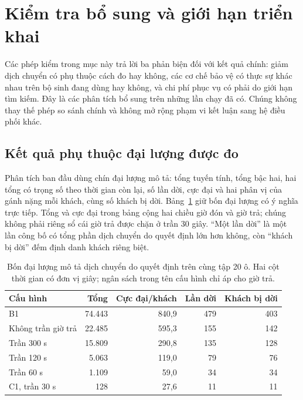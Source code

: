 \section{Kiểm tra bổ sung và giới hạn triển khai}
\label{muc:kiemtraphu}

Các phép kiểm trong mục này trả lời ba phản biện đối với kết quả chính: giảm dịch chuyển
có phụ thuộc cách đo hay không, các cơ chế bảo vệ có thực sự khác nhau trên bộ sinh đang
dùng hay không, và chi phí phục vụ có phải do giới hạn tìm kiếm. Đây là các phân tích bổ
sung trên những lần chạy đã có. Chúng không thay thế phép so sánh chính và không mở rộng
phạm vi kết luận sang hệ điều phối khác.

\subsection{Kết quả phụ thuộc đại lượng được đo}


Phân tích ban đầu dùng chín đại lượng mô tả: tổng tuyến tính, tổng bậc hai, hai tổng có
trọng số theo thời gian còn lại, số lần dời, cực đại và hai phân vị của gánh nặng mỗi khách,
cùng số khách bị dời. Bảng~\ref{bang:kiemtra-thuocdo} giữ bốn đại lượng có ý nghĩa trực
tiếp. Tổng và cực đại trong bảng cộng hai chiều giờ đón và giờ trả; chúng không phải riêng
sổ cái giờ trả được chặn ở trần 30 giây. ``Một lần dời'' là một lần công bố có tổng phần
dịch chuyển do quyết định lớn hơn không, còn ``khách bị dời'' đếm định danh khách riêng biệt.

\begin{table}[htbp]
\centering
\caption{Bốn đại lượng mô tả dịch chuyển do quyết định trên cùng tập 20 ô.
Hai cột thời gian có đơn vị giây; ngân sách trong tên cấu hình chỉ áp cho giờ trả.}
\label{bang:kiemtra-thuocdo}
\small
\begin{tabular}{@{}lrrrr@{}}
\toprule
\textbf{Cấu hình} & \textbf{Tổng} & \textbf{Cực đại/khách} & \textbf{Lần dời} & \textbf{Khách bị dời}\\
\midrule
B1 & 74.443 & 840{,}9 & 479 & 403\\
Không trần giờ trả & 22.485 & 595{,}3 & 155 & 142\\
Trần 300 s & 15.809 & 290{,}8 & 135 & 128\\
Trần 120 s & 5.063 & 119{,}0 & 79 & 76\\
Trần 60 s & 1.109 & 59{,}0 & 34 & 34\\
C1, trần 30 s & 128 & 27{,}6 & 11 & 11\\
\bottomrule
\end{tabular}
\end{table}

